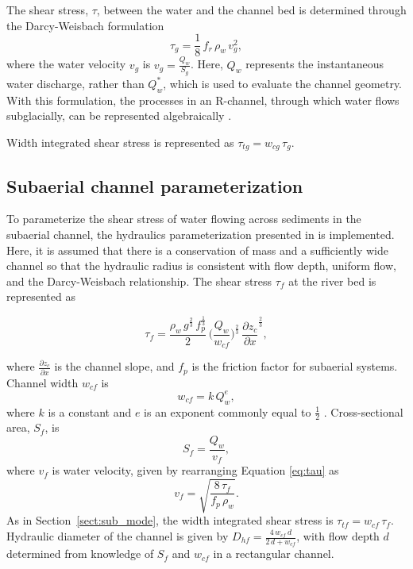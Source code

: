 \documentclass[11pt]{article}
\begin{document}
\begin{spacing}{1}
  The shear stress, $\tau$, between the water and the channel bed is determined through the Darcy-Weisbach formulation
  \begin{equation}
    \label{eq:tau}
    \tau_g=\frac{1}{8}\,f_r\,\rho_w\,v_g^2,
  \end{equation}
  where  the water velocity $v_g$ is $v_g = \frac{Q_w}{S_g}$.
  Here, $Q_w$ represents the instantaneous water discharge, rather than $Q_w^*$, which is used to evaluate the channel geometry.
  With this formulation, the processes in an R-channel, through which water flows subglacially, can be represented algebraically \citep{rothlisberger1972,delaney2019}.
  
    Width integrated shear stress is represented as $\tau_{tg}=w_{cg}\,\tau_g $.
  
  \subsection{Subaerial channel  parameterization}
  \label{sect:fluv}
  
  To parameterize the shear stress of water flowing across sediments in the subaerial channel,  the hydraulics parameterization presented in \citet{tucker1997} is implemented.
  Here, it is assumed that there is a conservation of mass and a sufficiently wide channel so that the hydraulic radius is consistent with flow depth, uniform flow, and the Darcy-Weisbach relationship.
  The shear stress $\tau_f$ at the river bed is represented as
  \begin{linenomath*}
    \begin{equation}
      \label{eq:DW_tau}
      \tau_f=\frac{\rho_w\,g^{\frac{2}{3}}\,f_p^{\frac{1}{3}}}{2}\, \Big(\frac{Q_w}{w_{cf}} \Big)^{\frac{2}{3}} \,\frac{\partial z_c}{\partial x}^{\frac{2}{3}},
    \end{equation}
  \end{linenomath*}
  where $\frac{\partial z_c}{\partial x}$ is the channel slope, and $f_p$ is the friction factor for subaerial systems.
  Channel width $w_{cf}$ is 
  \begin{equation}
    \label{eq:wcf}
    w_{cf} = k \, Q_w^e,
  \end{equation}
  where $k$ is a constant and $e$ is an exponent commonly equal to $\frac{1}{2}$ \citep{leopold1953}.
  Cross-sectional area, $ S_f$, is 
  \begin{equation}
    \label{eq:Sf}
    S_f = \frac{Q_w}{v_f},
  \end{equation}
  where $v_f$ is water velocity, given by rearranging Equation \ref{eq:tau} as
  \begin{equation}
    \label{eq:vf}
    v_f = \sqrt{\frac{8\,\tau_f}{f_p\,\rho_w}}.
  \end{equation}
  As in Section~\ref{sect:sub_mode}, the width integrated shear stress is $\tau_{tf}=w_{cf}\,\tau_f$.
  Hydraulic diameter of the channel is given by $D_{hf} = \frac{4\,w_{cf}\,d}{2\,d+w_{cf}}$, with flow depth $d$ determined from knowledge of $S_f$ and $w_{cf}$ in a rectangular channel.
  

\end{spacing}
\end{document}
